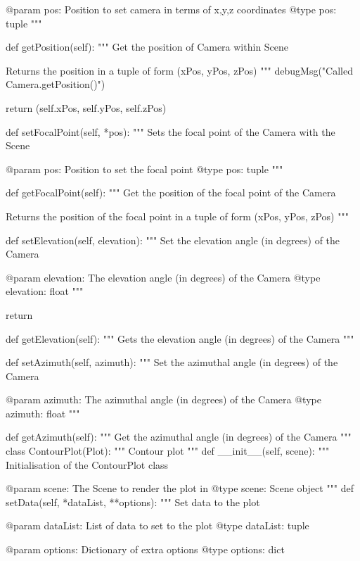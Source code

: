 \begin{python}
\begin{python}
\begin{verbose}
        @param pos: Position to set camera in terms of x,y,z coordinates
        @type pos: tuple
        """

    def getPosition(self):
        """
        Get the position of Camera within Scene

        Returns the position in a tuple of form (xPos, yPos, zPos)
        """
        debugMsg("Called Camera.getPosition()")

        return (self.xPos, self.yPos, self.zPos)

    def setFocalPoint(self, *pos):
        """
        Sets the focal point of the Camera with the Scene

        @param pos: Position to set the focal point
        @type pos: tuple
        """

    def getFocalPoint(self):
        """
        Get the position of the focal point of the Camera

        Returns the position of the focal point in a tuple of form 
        (xPos, yPos, zPos)
        """

    def setElevation(self, elevation):
        """
        Set the elevation angle (in degrees) of the Camera

        @param elevation: The elevation angle (in degrees) of the Camera
        @type elevation: float
        """

        return

    def getElevation(self):
        """
        Gets the elevation angle (in degrees) of the Camera
        """

    def setAzimuth(self, azimuth):
        """
        Set the azimuthal angle (in degrees) of the Camera

        @param azimuth: The azimuthal angle (in degrees) of the Camera
        @type azimuth: float
        """

    def getAzimuth(self):
        """
        Get the azimuthal angle (in degrees) of the Camera
        """
class ContourPlot(Plot):
    """
    Contour plot
    """
    def __init__(self, scene):
        """
        Initialisation of the ContourPlot class
        
        @param scene: The Scene to render the plot in
        @type scene: Scene object
        """
    def setData(self, *dataList, **options):
        """
        Set data to the plot

        @param dataList: List of data to set to the plot
        @type dataList: tuple

        @param options: Dictionary of extra options
        @type options: dict


\end{verbose}
\end{python}
\end{python}
